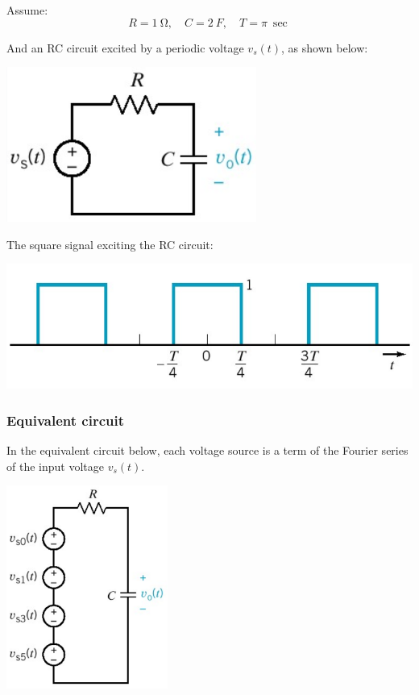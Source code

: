 \documentclass[11pt]{article}
\begin{document}
Assume:
\[R = \qty{1}{\ohm}, \quad C = \qty{2}{F}, \quad T = \pi \ \unit{\sec}\]

And an RC circuit excited by a periodic voltage \(v_s (t)\), as shown below:
\begin{center}
\includegraphics[width=.9\linewidth]{./images/rc-circuit-diagram.png}
\end{center}

The square signal exciting the RC circuit:
\begin{center}
\includegraphics[width=.9\linewidth]{./images/even-square-wave-function.png}
\end{center}

 \newpage
\subsubsection{Equivalent circuit}
\label{sec:org554f93c}
In the equivalent circuit below, each voltage source is a term of the Fourier series of the input voltage \(v_s (t)\).
\begin{center}
\includegraphics[height=18em]{./images/rc-equivalent-circuit-diagram.png}
\end{center}
\end{document}
